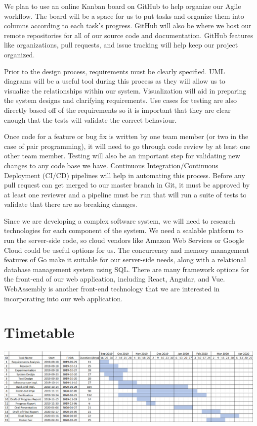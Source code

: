 \documentclass[letterpaper,12pt]{report}
\begin{document}
	We plan to use an online Kanban board on GitHub to help organize our Agile
	workflow. The board will be a space for us to put tasks and organize them
	into columns according to each task's progress. GitHub will also be where
	we host our remote repositories for all of our source code and
	documentation. GitHub features like organizations, pull requests, and issue
	tracking will help keep our project organized.

	Prior to the design process, requirements must be clearly specified. UML
	diagrams will be a useful tool during this process as they will allow us
	to visualize the relationships within our system. Visualization will aid
	in preparing the system designs and clarifying requirements. Use cases for
	testing are also directly based off of the requirements so it is important
	that they are clear enough that the tests will validate the correct
	behaviour.

	Once code for a feature or bug fix is written by one team member (or two in
	the case of pair programming), it will need to go through code review by at
	least one other team member. Testing will also be an important step for
	validating new changes to any code base we have. Continuous
	Integration/Continuous Deployment (CI/CD) pipelines will help in automating
	this process. Before any pull request can get merged to our master branch
	in Git, it must be approved by at least one reviewer and a pipeline must be
	run that will run a suite of tests to validate that there are no breaking
	changes.

	Since we are developing a complex software system, we will need to research
	technologies for each component of the system. We need a scalable platform
	to run the server-side code, so cloud vendors like Amazon Web Services or
	Google Cloud could be useful options for us. The concurrency and memory
	management features of Go make it suitable for our server-side needs, along
	with a relational database management system using SQL. There are many
	framework options for the front-end of our web application, including
	React, Angular, and Vue. WebAssembly is another front-end technology that
	we are interested in incorporating into our web application.

	\section*{Timetable}
	\markright{}
	\includegraphics[width=\linewidth]{timetable.png}
\end{document}
